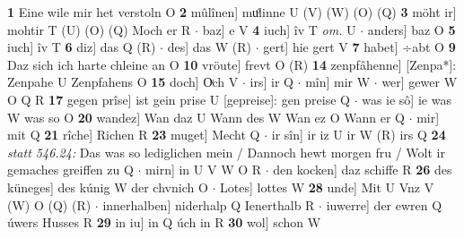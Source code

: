 \documentclass[8pt,a4paper,notitlepage]{article}
\begin{document}
\begin{table}[ht]
\begin{minipage}[t]{0.5\linewidth}
\textbf{1} Eine wile mir het verstoln O \textbf{2} mûlînen] muͦlinne U (V) (W) (O) (Q) \textbf{3} möht ir] mohtir T (U) (O) (Q) Moch er R  $\cdot$ baz] e V \textbf{4} iuch] îv T \textit{om.} U  $\cdot$ anders] baz O \textbf{5} iuch] îv T \textbf{6} diz] das Q (R)  $\cdot$ des] das W (R)  $\cdot$ gert] hie gert V \textbf{7} habet] ÷abt O \textbf{9} Daz sich ich harte chleine an O \textbf{10} vröute] frevt O (R) \textbf{14} zenpfâhenne] [Zenpa*]: Zenpahe U Zenpfahens O \textbf{15} doch] Oͮch V  $\cdot$ irs] ir Q  $\cdot$ mîn] mir W  $\cdot$ wer] gewer W O Q R \textbf{17} gegen prîse] ist gein prise U [gepreise]: gen preise Q  $\cdot$ was ie sô] ie was W was so O \textbf{20} wandez] Wan daz U Wann des W Wan ez O Wann er Q  $\cdot$ mir] mit Q \textbf{21} rîche] Richen R \textbf{23} muget] Mecht Q  $\cdot$ ir sîn] ir iz U ir W (R) irs Q \textbf{24} \textit{statt 546.24:} Das was so lediglichen mein / Dannoch hewt morgen fru / Wolt ir gemaches greiffen zu Q   $\cdot$ mirn] in U V W O R  $\cdot$ den kocken] daz schiffe R \textbf{26} des küneges] des kúnig W der chvnich O  $\cdot$ Lotes] lottes W \textbf{28} unde] Mit U Vnz V (W) O (Q) (R)  $\cdot$ innerhalben] niderhalp Q Ienerthalb R  $\cdot$ iuwerre] der ewren Q úwers Husses R \textbf{29} in iu] in Q úch in R \textbf{30} wol] schon W \newline
\end{minipage}
\end{table}
\end{document}
